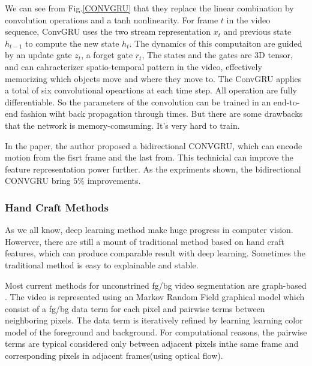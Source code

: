 We can see from Fig.\ref{CONVGRU} that they replace the linear combination by convolution operations and a tanh nonlinearity. For frame $t$ in the video
sequence, ConvGRU uses the two stream representation $x_t$ and previous state $h_{t-1}$ to compute the new state $h_t$. The dynamics of this computaiton 
are guided by an update gate $z_t$, a forget gate $r_t$, The states  and the gates are $3$D tensor, and can cahracterizer spatio-temporal pattern in
the video, effectively memorizing which objects move and where they move to. The ConvGRU applies a total of six convolutional opeartions at each time step.
All operation are fully differentiable. So the parameters of the convolution can be trained in an end-to-end fashion wiht back propagation through times.
But there are some drawbacks that the network is memory-comsuming. It's very hard to train. 

In the paper, the author proposed a bidirectional CONVGRU, which can encode motion from the fisrt frame and the last from. This technicial can improve the feature
representation power further. As the expriments shown, the bidirectional CONVGRU bring $5\%$ improvements.

\subsubsection{Hand Craft Methods}

As we all know, deep learning method make huge progress in computer vision. Howerver, there are still a mount of traditional method based on 
hand craft features, which can produce comparable result with deep learning. Sometimes the traditional method is easy to explainable and stable.

Most current methods for unconstrined fg/bg video segmentation are graph-based \cite{Lee2011Key, Papazoglou2013Fast, zhang2013video}. The video
is represented using an Markov Random Field graphical model which consist of a fg/bg data term for each pixel and pairwise
terms between neighboring pixels. The data term is iteratively refined by learning learning color model of the foreground
and background. For computational reasons, the pairwise  terms are typical considered only between adjacent pixels inthe same 
frame and corresponding pixels in adjacent frames(using optical flow).







